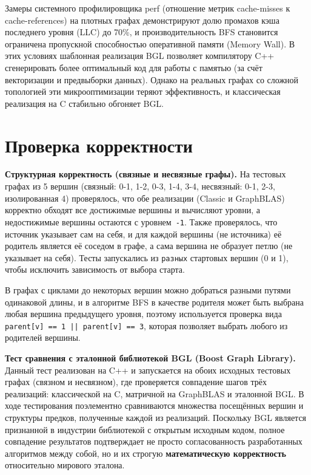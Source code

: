 \documentclass[a4paper]{article}
\begin{document}
Замеры системного профилировщика perf (отношение метрик cache-misses к cache-references) на плотных графах демонстрируют долю промахов кэша последнего уровня (LLC) до 70\%, и производительность BFS становится ограничена пропускной способностью оперативной памяти (Memory Wall). В этих условиях шаблонная реализация BGL позволяет компилятору C++ сгенерировать более оптимальный код для работы с памятью (за счёт векторизации и предвыборки данных). Однако на реальных графах со сложной топологией эти микрооптимизации теряют эффективность, и классическая реализация на C стабильно обгоняет BGL.

\section{Проверка корректности}

\textbf{Структурная корректность (связные и несвязные графы).} На тестовых графах из 5 вершин (связный: 0-1, 1-2, 0-3, 1-4, 3-4, несвязный: 0-1, 2-3, изолированная 4) проверялось, что обе реализации (Classic и GraphBLAS) корректно обходят все достижимые вершины и вычисляют уровни, а недостижимые вершины остаются с уровнем~\texttt{-1}. Также проверялось, что источник указывает сам на себя, и для каждой вершины (не источника) её родитель является её соседом в графе, а сама вершина не образует петлю (не указывает на себя). Тесты запускались из \texttt{разных} стартовых вершин (0 и 1), чтобы исключить зависимость от выбора старта.

В графах с циклами до некоторых вершин можно добраться разными путями одинаковой длины, и в алгоритме BFS в качестве родителя может быть выбрана любая вершина предыдущего уровня, поэтому используется проверка вида \texttt{parent[v] == 1 || parent[v] == 3}, которая позволяет выбрать любого из родителей вершины.

\textbf{Тест сравнения с эталонной библиотекой BGL (Boost Graph Library).} Данный тест реализован на C++ и запускается на обоих исходных тестовых графах (связном и несвязном), где проверяется совпадение шагов трёх реализаций: классической на C, матричной на GraphBLAS и эталонной BGL. В ходе тестирования поэлементно сравниваются множества посещённых вершин и структуры предков, полученные каждой из реализаций. Поскольку BGL является признанной в индустрии библиотекой с открытым исходным кодом, полное совпадение результатов подтверждает не просто согласованность разработанных алгоритмов между собой, но и их строгую \textbf{математическую корректность} относительно мирового эталона.
\end{document}
